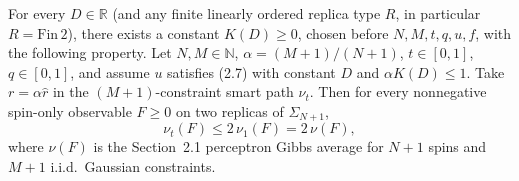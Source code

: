 \begin{lemma}\label{lem:sg-tal:perceptron-cavity-lemma-237}
  \leanok
For every $D\in\mathbb R$ (and any finite linearly ordered replica type $R$, in particular $R=\mathrm{Fin}\,2$), there exists a constant
$K(D)\ge0$, chosen before $N,M,t,q,u,f$, with the following property. Let $N,M\in\mathbb N$, $\alpha=(M+1)/(N+1)$, $t\in[0,1]$, $q\in[0,1]$,
and assume $u$ satisfies (2.7) with constant $D$ and $\alpha K(D)\le1$. Take $r=\alpha\widehat r$ in the $(M+1)$-constraint smart path $\nu_t$.
Then for every nonnegative spin-only observable $F\ge0$ on two replicas of $\Sigma_{N+1}$,
\[
 \nu_t(F)\le 2\,\nu_1(F)=2\,\nu(F),
\]
where $\nu(F)$ is the Section~2.1 perceptron Gibbs average for $N+1$ spins and $M+1$ i.i.d.\ Gaussian constraints.
\end{lemma}
